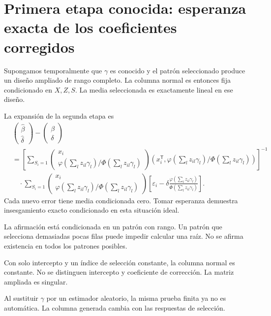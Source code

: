\documentclass[11pt,a4paper]{article}
\newcommand{\T}{^{\mathsf T}}
\begin{document}
\clearpage
\section{Primera etapa conocida: esperanza exacta de los coeficientes corregidos}\label{unidad130}
Supongamos temporalmente que \(\gamma\)
es conocido y el patrón seleccionado
produce un diseño ampliado de rango completo.
La columna normal es entonces
fija condicionado en \(X,Z,S\).
La media seleccionada es
exactamente lineal en ese diseño.

La expansión de la segunda etapa es
\[
\begin{aligned}
&\begin{pmatrix}\widehat\beta\\\widehat\delta\end{pmatrix}
-\begin{pmatrix}\beta\\\delta\end{pmatrix}\\
&=
\left[\sum_{S_i=1}
\begin{pmatrix}x_i\\\varphi(\sum_lz_{il}\gamma_l)/\Phi(\sum_lz_{il}\gamma_l)\end{pmatrix}
(x_i\T,\varphi(\sum_lz_{il}\gamma_l)/\Phi(\sum_lz_{il}\gamma_l))
\right]^{-1}\\
&\quad\cdot\sum_{S_i=1}
\begin{pmatrix}x_i\\\varphi(\sum_lz_{il}\gamma_l)/\Phi(\sum_lz_{il}\gamma_l)\end{pmatrix}
\left[\varepsilon_i-
\delta\frac{\varphi(\sum_lz_{il}\gamma_l)}
{\Phi(\sum_lz_{il}\gamma_l)}\right].
\end{aligned}
\]
Cada nuevo error tiene
media condicionada cero.
Tomar esperanza demuestra
insesgamiento exacto condicionado
en esta situación ideal.

La afirmación está condicionada
en un patrón con rango.
Un patrón que selecciona
demasiadas pocas filas puede
impedir calcular una raíz.
No se afirma existencia
en todos los patrones posibles.

\begin{ejemplo}[Un límite]
Con solo intercepto y
un índice de selección constante,
la columna normal es constante.
No se distinguen intercepto y
coeficiente de corrección.
La matriz ampliada es singular.
\end{ejemplo}
Al sustituir \(\gamma\) por
un estimador aleatorio,
la misma prueba finita ya
no es automática.
La columna generada cambia
con las respuestas de selección.
\end{document}
